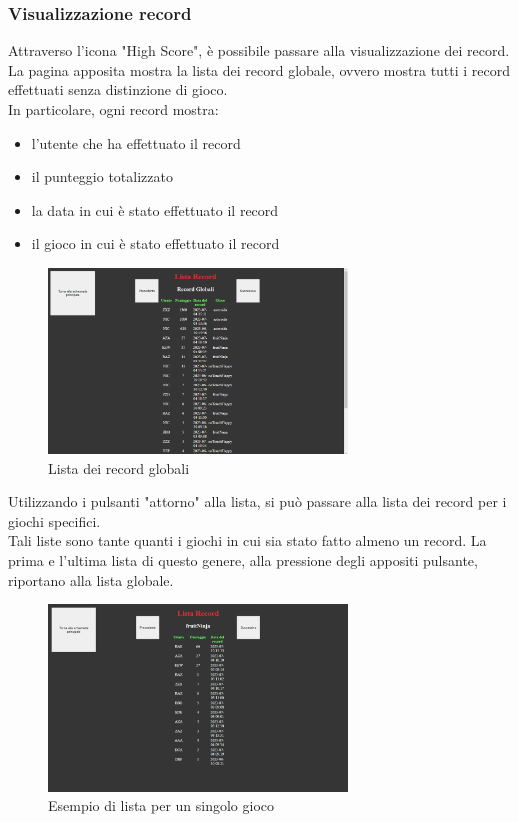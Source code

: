 \subsubsection{Visualizzazione record}
Attraverso l'icona "High Score", è possibile passare alla visualizzazione dei record.\\
La pagina apposita mostra la lista dei record globale, ovvero mostra tutti i record effettuati senza distinzione di gioco.\\
In particolare, ogni record mostra:
\begin{itemize}
    \item l'utente che ha effettuato il record
    \item il punteggio totalizzato
    \item la data in cui è stato effettuato il record
    \item il gioco in cui è stato effettuato il record
\end{itemize}
\begin{figure}[h]
    \centering
    \includegraphics[width=225pt]{images/product/schermataRecord.png}
    \caption{Lista dei record globali}
    \label{fig:schermataRecord}
\end{figure}
Utilizzando i pulsanti "attorno" alla lista, si può passare alla lista dei record per i giochi specifici.\\
Tali liste sono tante quanti i giochi in cui sia stato fatto almeno un record.
La prima e l'ultima lista di questo genere, alla pressione degli appositi pulsante, riportano alla lista globale.
\begin{figure}[h]
    \centering
    \includegraphics[width=225pt]{images/product/schermataRecordSingoloGioco.png}
    \caption{Esempio di lista per un singolo gioco}
    \label{fig:schermataRecordSingoloGioco}
\end{figure}
\newpage
